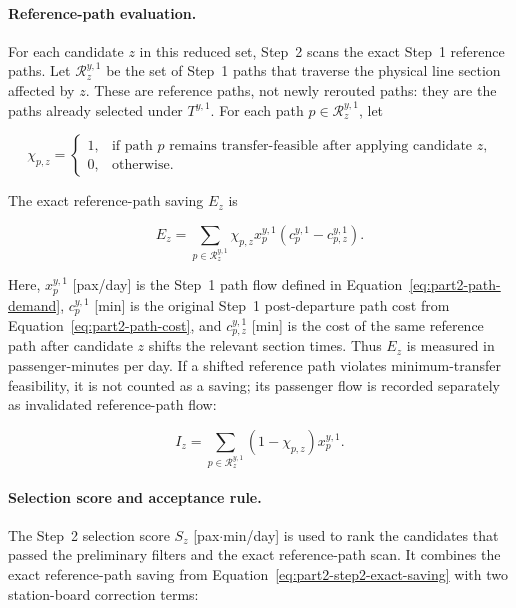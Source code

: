 \documentclass[preprint,12pt]{elsarticle}
\begin{document}
\paragraph*{Reference-path evaluation.}
For each candidate \(z\) in this reduced set, Step~2 scans the exact Step~1 reference paths. Let \(\mathcal{R}^{y,1}_z\) be the set of Step~1 paths that traverse the physical line section affected by \(z\). These are reference paths, not newly rerouted paths: they are the paths already selected under \(T^{y,1}\). For each path \(p\in\mathcal{R}^{y,1}_z\), let

\[
\chi_{p,z}
=
\begin{cases}
1, & \text{if path \(p\) remains transfer-feasible after applying candidate \(z\),}\\
0, & \text{otherwise.}
\end{cases}
\]

The exact reference-path saving \(E_z\) is

\begin{equation}
E_z
=
\sum_{p\in\mathcal{R}^{y,1}_z}
\chi_{p,z}
x_p^{y,1}
\left(
c_p^{y,1}
-
c_{p,z}^{y,1}
\right).
\label{eq:part2-step2-exact-saving}
\end{equation}

Here, \(x_p^{y,1}\) [pax/day] is the Step~1 path flow defined in Equation~\eqref{eq:part2-path-demand}, \(c_p^{y,1}\) [min] is the original Step~1 post-departure path cost from Equation~\eqref{eq:part2-path-cost}, and \(c_{p,z}^{y,1}\) [min] is the cost of the same reference path after candidate \(z\) shifts the relevant section times. Thus \(E_z\) is measured in passenger-minutes per day. If a shifted reference path violates minimum-transfer feasibility, it is not counted as a saving; its passenger flow is recorded separately as invalidated reference-path flow:

\begin{equation}
I_z
=
\sum_{p\in\mathcal{R}^{y,1}_z}
(1-\chi_{p,z})
x_p^{y,1}.
\label{eq:part2-step2-invalidated-flow}
\end{equation}
\paragraph*{Selection score and acceptance rule.}
The Step~2 selection score \(S_z\) [pax\(\cdot\)min/day] is used to rank the candidates that passed the preliminary filters and the exact reference-path scan. It combines the exact reference-path saving from Equation~\eqref{eq:part2-step2-exact-saving} with two station-board correction terms:
\end{document}

